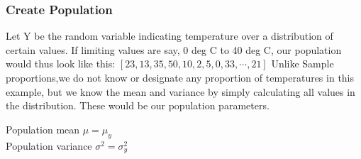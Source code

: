 \documentclass[float=false,crop=false]{standalone}
\begin{document}
\subsubsection{Create Population}\label{create-population}

Let Y be the random variable indicating temperature over a distribution
of certain values. If limiting values are say, 0 deg C to 40 deg C, our
population would thus look like this:
\([23,13,35,50,10,2,5,0,33, \cdots ,21]\) Unlike Sample proportions,we
do not know or designate any proportion of temperatures in this example,
but we know the mean and variance by simply calculating all values in
the distribution. These would be our population parameters.

Population mean \(\mu = \mu_y\)\\
Population variance \(\sigma^2 = \sigma_y^2\)
\end{document}
